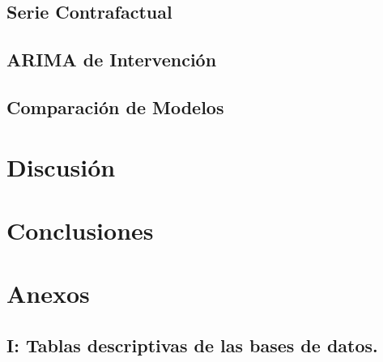 \documentclass[10pt,twoside,xcolor=table,x11anmes]{IEEEtran}
\begin{document}
\subsection{Serie Contrafactual}

\subsection{ARIMA de Intervención}

\subsection{Comparación de Modelos}





\section[Discusión]{Discusión}


\section[Conclusiones]{Conclusiones}

\section*{Anexos}

\newpage


\subsection{I: Tablas descriptivas de las bases de datos.}
\end{document}
